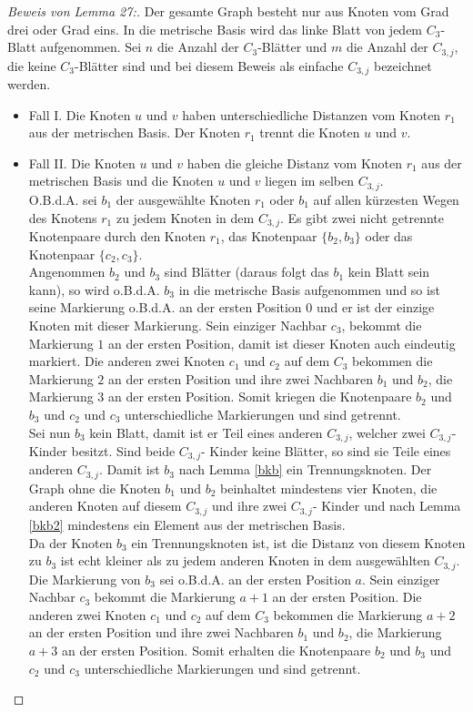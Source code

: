 \begin{proof}[Beweis von Lemma 27:]
Der gesamte Graph besteht nur aus Knoten vom Grad drei oder Grad eins. In die metrische Basis wird das linke Blatt von jedem $C_{3}$-Blatt aufgenommen. Sei $n$ die Anzahl der $C_{3}$-Blätter und $m$ die Anzahl der $C_{3,j}$, die keine $C_{3}$-Blätter sind und bei diesem Beweis als einfache $C_{3,j}$ bezeichnet werden.
\begin{itemize}
\item Fall I. Die Knoten $u$ und $v$ haben unterschiedliche Distanzen vom Knoten $r_1$ aus der metrischen Basis. Der Knoten $r_1$ trennt die Knoten $u$ und $v$.
\item Fall II. Die Knoten $u$ und $v$ haben die gleiche Distanz vom Knoten $r_1$ aus der metrischen Basis und die Knoten $u$ und $v$ liegen im selben $C_{3,j}$.\\
O.B.d.A. sei $b_1$ der ausgewählte Knoten $r_1$ oder $b_1$ auf allen kürzesten Wegen des Knotens $r_1$ zu jedem Knoten in dem $C_{3,j}$. Es gibt zwei nicht getrennte Knotenpaare durch den Knoten $r_1$, das Knotenpaar $\{b_2,b_3\}$ oder das Knotenpaar $\{c_2,c_3\}$.\\
Angenommen $b_2$ und $b_3$ sind Blätter (daraus folgt das $b_1$ kein Blatt sein kann), so wird o.B.d.A. $b_3$ in die metrische Basis aufgenommen und so ist seine Markierung o.B.d.A. an der ersten Position $0$ und er ist der einzige Knoten mit dieser Markierung. Sein einziger Nachbar $c_3$, bekommt die Markierung $1$ an der ersten Position, damit ist dieser Knoten auch eindeutig markiert. Die anderen zwei Knoten $c_1$ und $c_2$ auf dem $C_3$ bekommen die Markierung $2$ an der ersten Position und ihre zwei Nachbaren $b_1$ und $b_2$, die Markierung $3$ an der ersten Position. Somit kriegen die Knotenpaare $b_2$ und $b_3$ und $c_2$ und $c_3$ unterschiedliche Markierungen und sind getrennt.\\ 	 
Sei nun $b_3$ kein Blatt, damit ist er Teil eines anderen $C_{3,j}$, welcher zwei $C_{3,j}$-Kinder besitzt. Sind beide $C_{3,j}$- Kinder keine Blätter, so sind sie Teile eines anderen $C_{3,j}$. Damit ist $b_3$ nach Lemma \ref{bkb} ein Trennungsknoten. Der Graph ohne die Knoten $b_1$ und $b_2$ beinhaltet mindestens vier Knoten, die anderen Knoten auf diesem $C_{3,j}$ und ihre zwei $C_{3,j}$- Kinder und nach Lemma \ref{bkb2} mindestens ein Element aus der metrischen Basis.\\
Da der Knoten $b_3$ ein Trennungsknoten ist, ist die Distanz von diesem Knoten zu $b_3$ ist echt kleiner als zu jedem anderen Knoten in dem ausgewählten $C_{3,j}$. Die Markierung von $b_3$ sei o.B.d.A. an der ersten Position $a$. Sein einziger Nachbar $c_3$ bekommt die Markierung $a+1$ an der ersten Position. Die anderen zwei Knoten $c_1$ und $c_2$ auf dem $C_3$ bekommen die Markierung $a+2$ an der ersten Position und ihre zwei Nachbaren $b_1$ und $b_2$, die Markierung $a+3$ an der ersten Position. Somit erhalten die Knotenpaare $b_2$ und $b_3$ und $c_2$ und $c_3$ unterschiedliche Markierungen und sind getrennt.

\end{itemize}
\end{proof}
